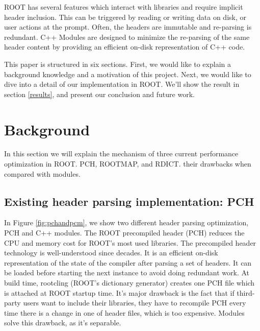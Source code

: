 \documentclass{webofc}
\begin{document}
ROOT has several features which interact with libraries and require implicit header inclusion. This can be triggered by reading or writing data on disk, or user actions at the prompt. Often, the headers are immutable and re-parsing is redundant. C++ Modules are designed to minimize the re-parsing of the same header content by providing an efficient on-disk representation of C++ code.

This paper is structured in six sections. First, we would like to explain a background knowledge and a motivation of this project. Next, we would like to dive into a detail of our implementation in ROOT. We'll show the result in section \ref{results}, and present our conclusion and future work.

\section{Background}
\label{background}

In this section we will explain the mechanism of three current performance optimization in ROOT. PCH, ROOTMAP, and RDICT. their drawbacks when compared with modules.

\subsection{Existing header parsing implementation: PCH}
\label{pch}

In Figure \ref{fig:pchandpcm}, we show two different header parsing optimization, PCH and C++ modules. The ROOT precompiled header (PCH) reduces the CPU and memory cost for ROOT’s most used libraries. The precompiled header technology is well-understood since decades. It is an efficient on-disk representation of the state of the compiler after parsing a set of headers. It can be loaded before starting the next instance to avoid doing redundant work. At build time, rootcling (ROOT’s dictionary generator) creates one PCH file which is attached at ROOT startup time. It's major drawback is the fact that if third-party users want to include their libraries, they have to recompile PCH every time there is a change in one of header files, which is too expensive. Modules solve this drawback, as it's separable.
\end{document}
